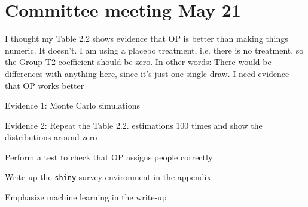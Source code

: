 \documentclass[12pt]{article}
\begin{document}



\section*{Committee meeting May 21}
	\begin{coi}
		\item I thought my Table 2.2 shows evidence that OP is better than making things numeric. It doesn't. I am using a placebo treatment, i.e. there is no treatment, so the Group T2 coefficient should be zero. In other words: There would be differences with anything here, since it's just one single draw. I need evidence that OP works better
			\begin{coi}
				\item Evidence 1: Monte Carlo simulations
				\item Evidence 2: Repeat the Table 2.2. estimations 100 times and show the distributions around zero
			\end{coi}
		\item Perform a test to check that OP assigns people correctly
		\item Write up the \texttt{shiny} survey environment in the appendix
		\item Emphasize machine learning in the write-up
	\end{coi}
	
\end{document}

